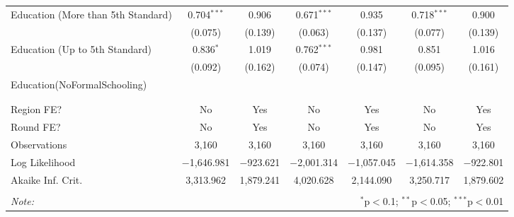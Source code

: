 \begin{tabular}{@{\extracolsep{5pt}}lcccccc}
  Education (More than 5th Standard) & 0.704$^{***}$ & 0.906 & 0.671$^{***}$ & 0.935 & 0.718$^{***}$ & 0.900 \\ 
  & (0.075) & (0.139) & (0.063) & (0.137) & (0.077) & (0.139) \\ 
  Education (Up to 5th Standard) & 0.836$^{*}$ & 1.019 & 0.762$^{***}$ & 0.981 & 0.851 & 1.016 \\ 
  & (0.092) & (0.162) & (0.074) & (0.147) & (0.095) & (0.161) \\ 
  Education(NoFormalSchooling) &  &  &  &  &  &  \\ 
  &  &  &  &  &  &  \\ 
 \hline \\[-1.8ex] 
Region FE? & No & Yes & No & Yes & No & Yes \\ 
Round FE? & No & Yes & No & Yes & No & Yes \\ 
Observations & 3,160 & 3,160 & 3,160 & 3,160 & 3,160 & 3,160 \\ 
Log Likelihood & $-$1,646.981 & $-$923.621 & $-$2,001.314 & $-$1,057.045 & $-$1,614.358 & $-$922.801 \\ 
Akaike Inf. Crit. & 3,313.962 & 1,879.241 & 4,020.628 & 2,144.090 & 3,250.717 & 1,879.602 \\ 
\hline 
\hline \\[-1.8ex] 
\textit{Note:}  & \multicolumn{6}{r}{$^{*}$p$<$0.1; $^{**}$p$<$0.05; $^{***}$p$<$0.01} \\ 
\end{tabular} 
